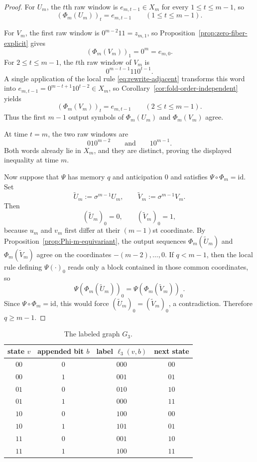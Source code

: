 \documentclass[11pt,letterpaper]{article}
\numberwithin{equation}{section}
\theoremstyle{plain}
\theoremstyle{definition}
\theoremstyle{remark}
\begin{document}
\begin{proof}
For $U_m$, the $t$th raw window is $e_{m,t-1}\in X_m$ for every
$1\le t\le m-1$, so
\[
(\Phi_m(U_m))_t=e_{m,t-1}
\qquad (1\le t\le m-1).
\]

For $V_m$, the first raw window is $0^{m-2}11=z_{m,1}$, so
Proposition~\ref{prop:zero-fiber-explicit} gives
\[
(\Phi_m(V_m))_1=0^m=e_{m,0}.
\]
For $2\le t\le m-1$, the $t$th raw window of $V_m$ is
\[
0^{m-t-1}110^{t-1}.
\]
A single application of the local rule \eqref{eq:rewrite-adjacent} transforms
this word into $e_{m,t-1}=0^{m-t+1}10^{t-2}\in X_m$, so
Corollary~\ref{cor:fold-order-independent} yields
\[
(\Phi_m(V_m))_t=e_{m,t-1}
\qquad (2\le t\le m-1).
\]
Thus the first $m-1$ output symbols of $\Phi_m(U_m)$ and $\Phi_m(V_m)$ agree.

At time $t=m$, the two raw windows are
\[
010^{m-2}
\qquad\text{and}\qquad
10^{m-1}.
\]
Both words already lie in $X_m$, and they are distinct, proving the displayed
inequality at time $m$.

Now suppose that $\Psi$ has memory $q$ and anticipation $0$ and satisfies
$\Psi\circ\Phi_m=\mathrm{id}$.  Set
\[
\widetilde U_m:=\sigma^{m-1}U_m,
\qquad
\widetilde V_m:=\sigma^{m-1}V_m.
\]
Then
\[
(\widetilde U_m)_0=0,
\qquad
(\widetilde V_m)_0=1,
\]
because $u_m$ and $v_m$ first differ at their $(m-1)$st coordinate.  By
Proposition~\ref{prop:Phi-m-equivariant}, the output sequences
$\Phi_m(\widetilde U_m)$ and $\Phi_m(\widetilde V_m)$ agree on the coordinates
$-(m-2),\ldots,0$.  If $q<m-1$, then the local rule defining $\Psi(\cdot)_0$
reads only a block contained in those common coordinates, so
\[
\Psi(\Phi_m(\widetilde U_m))_0=\Psi(\Phi_m(\widetilde V_m))_0.
\]
Since $\Psi\circ\Phi_m=\mathrm{id}$, this would force
$(\widetilde U_m)_0=(\widetilde V_m)_0$, a contradiction.  Therefore
$q\ge m-1$.
\end{proof}

\begin{table}[t]
\centering
\small
\begin{tabular}{cccc}
\toprule
state $v$ & appended bit $b$ & label $\ell_3(v,b)$ & next state \\
\midrule
$00$ & $0$ & $000$ & $00$ \\
$00$ & $1$ & $001$ & $01$ \\
$01$ & $0$ & $010$ & $10$ \\
$01$ & $1$ & $000$ & $11$ \\
$10$ & $0$ & $100$ & $00$ \\
$10$ & $1$ & $101$ & $01$ \\
$11$ & $0$ & $001$ & $10$ \\
$11$ & $1$ & $100$ & $11$ \\
\bottomrule
\end{tabular}
\caption{The labeled graph $G_3$.}
\label{tab:G3}
\end{table}
\end{document}
